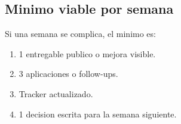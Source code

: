 \subsection{Minimo viable por semana}


Si una semana se complica, el minimo es:


\begin{enumerate}
\item 1 entregable publico o mejora visible.
\item 3 aplicaciones o follow-ups.
\item Tracker actualizado.
\item 1 decision escrita para la semana siguiente.
\end{enumerate}
